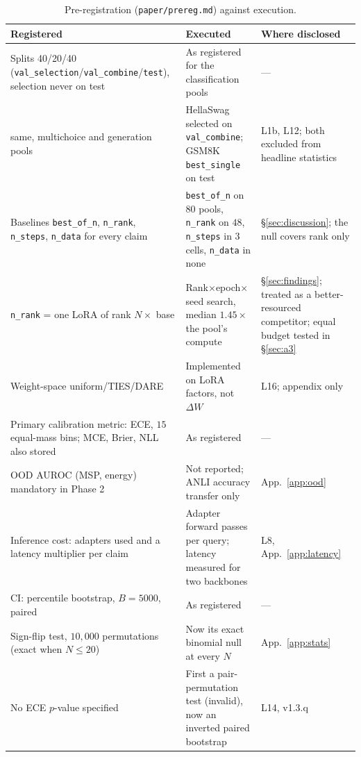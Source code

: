 \documentclass[11pt]{article}
\begin{document}
\begin{table}[t]
\centering\small
\setlength{\tabcolsep}{3pt}
\caption{Pre-registration (\texttt{paper/\allowbreak prereg.md}) against execution.}
\label{tab:prexec}
\begin{tabular}{@{}>{\raggedright\arraybackslash}p{}>{\raggedright\arraybackslash}p{}>{\raggedright\arraybackslash}p{}@{}}
\toprule
Registered & Executed & Where disclosed \\
\midrule
Splits 40/20/40 (\texttt{val\_selection}/\texttt{val\_combine}/\texttt{test}), selection never on test & As registered for the classification pools & --- \\
\quad same, multichoice and generation pools & HellaSwag selected on \texttt{val\_combine}; GSM8K \texttt{best\_single} on test & L1b, L12; both excluded from headline statistics \\
Baselines \texttt{best\_of\_n}, \texttt{n\_rank}, \texttt{n\_steps}, \texttt{n\_data} for every claim & \texttt{best\_of\_n} on $80$ pools, \texttt{n\_rank} on $48$, \texttt{n\_steps} in $3$ cells, \texttt{n\_data} in none & \S\ref{sec:discussion}; the null covers rank only \\
\texttt{n\_rank} = one LoRA of rank $N\times$ base & Rank$\times$epoch$\times$seed search, median $1.45\times$ the pool's compute & \S\ref{sec:findings}; treated as a better-resourced competitor; equal budget tested in \S\ref{sec:a3} \\
Weight-space uniform/TIES/DARE & Implemented on LoRA factors, not $\Delta W$ & L16; appendix only \\
Primary calibration metric: ECE, $15$ equal-mass bins; MCE, Brier, NLL also stored & As registered & --- \\
OOD AUROC (MSP, energy) mandatory in Phase 2 & Not reported; ANLI accuracy transfer only & App.~\ref{app:ood} \\
Inference cost: adapters used and a latency multiplier per claim & Adapter forward passes per query; latency measured for two backbones & L8, App.~\ref{app:latency} \\
CI: percentile bootstrap, $B{=}5000$, paired & As registered & --- \\
Sign-flip test, $10{,}000$ permutations (exact when $N{\leq}20$) & Now its exact binomial null at every $N$ & App.~\ref{app:stats} \\
No ECE $p$-value specified & First a pair-permutation test (invalid), now an inverted paired bootstrap & L14, v1.3.q \\

\end{tabular}
\end{table}
\end{document}
